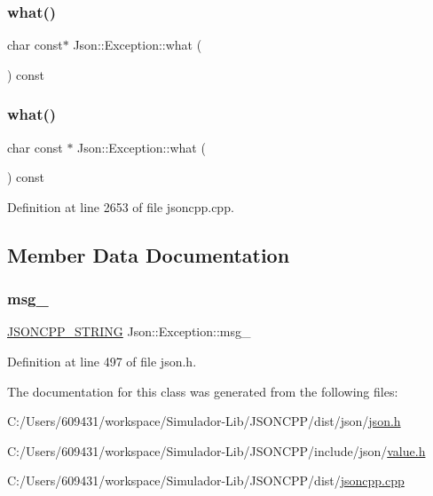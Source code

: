 \subsubsection{\texorpdfstring{what()}{what()}\hspace{0.1cm}{\footnotesize\ttfamily [1/2]}}
{\footnotesize\ttfamily char const$\ast$ Json\+::\+Exception\+::what (\begin{DoxyParamCaption}{ }\end{DoxyParamCaption}) const}

\hypertarget{class_json_1_1_exception_a70b7ce35e761fb93e8cd338e04619cd6}{}\label{class_json_1_1_exception_a70b7ce35e761fb93e8cd338e04619cd6} 
\subsubsection{\texorpdfstring{what()}{what()}\hspace{0.1cm}{\footnotesize\ttfamily [2/2]}}
{\footnotesize\ttfamily char const  $\ast$ Json\+::\+Exception\+::what (\begin{DoxyParamCaption}{ }\end{DoxyParamCaption}) const}



Definition at line 2653 of file jsoncpp.\+cpp.



\subsection{Member Data Documentation}
\hypertarget{class_json_1_1_exception_aae3cbb8b45bf21480f64502a8329659f}{}\label{class_json_1_1_exception_aae3cbb8b45bf21480f64502a8329659f} 
\subsubsection{\texorpdfstring{msg\+\_\+}{msg\_}}
{\footnotesize\ttfamily \hyperlink{config_8h_a1e723f95759de062585bc4a8fd3fa4be}{J\+S\+O\+N\+C\+P\+P\+\_\+\+S\+T\+R\+I\+NG} Json\+::\+Exception\+::msg\+\_\+\hspace{0.3cm}{\ttfamily [protected]}}



Definition at line 497 of file json.\+h.



The documentation for this class was generated from the following files\+:\begin{DoxyCompactItemize}
\item 
C\+:/\+Users/609431/workspace/\+Simulador-\/\+Lib/\+J\+S\+O\+N\+C\+P\+P/dist/json/\hyperlink{dist_2json_2json_8h}{json.\+h}\item 
C\+:/\+Users/609431/workspace/\+Simulador-\/\+Lib/\+J\+S\+O\+N\+C\+P\+P/include/json/\hyperlink{value_8h}{value.\+h}\item 
C\+:/\+Users/609431/workspace/\+Simulador-\/\+Lib/\+J\+S\+O\+N\+C\+P\+P/dist/\hyperlink{jsoncpp_8cpp}{jsoncpp.\+cpp}\end{DoxyCompactItemize}
